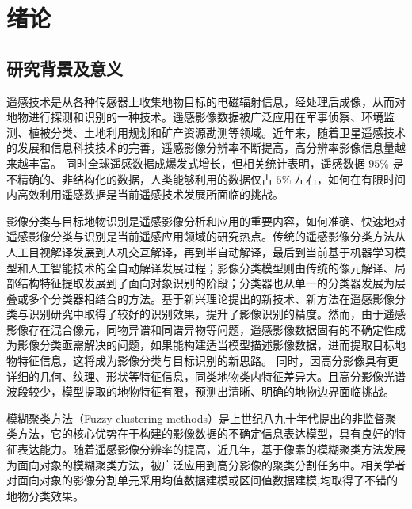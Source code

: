 
\chapter{绪论}
\label{cha:chap01}

\section{研究背景及意义}
\label{sec:first}

遥感技术是从各种传感器上收集地物目标的电磁辐射信息，经处理后成像，从而对地物进行探测和识别的一种技术。遥感影像数据被广泛应用在军事侦察、环境监测、植被分类、土地利用规划和矿产资源勘测等领域\cite{lishihua2005}。近年来，随着卫星遥感技术的发展和信息科技技术的完善，遥感影像分辨率不断提高，高分辨率影像信息量越来越丰富。 同时全球遥感数据成爆发式增长，但相关统计表明，遥感数据 $95\%$ 是不精确的、非结构化的数据，人类能够利用的数据仅占 $5\%$ 左右\cite{zhangjun2010}，如何在有限时间内高效利用遥感数据是当前遥感技术发展所面临的挑战。

影像分类与目标地物识别是遥感影像分析和应用的重要内容，如何准确、快速地对遥感影像分类与识别是当前遥感应用领域的研究热点。传统的遥感影像分类方法从人工目视解译发展到人机交互解译，再到半自动解译，最后到当前基于机器学习模型和人工智能技术的全自动解译发展过程；影像分类模型则由传统的像元解译、局部结构特征提取发展到了面向对象识别的阶段；分类器也从单一的分类器发展为层叠或多个分类器相结合的方法\cite{lideren2012}。基于新兴理论提出的新技术、新方法在遥感影像分类与识别研究中取得了较好的识别效果，提升了影像识别的精度。然而，由于遥感影像存在混合像元，同物异谱和同谱异物等问题\cite{wulun2006}，遥感影像数据固有的不确定性成为影像分类亟需解决的问题，如果能构建适当模型描述影像数据，进而提取目标地物特征信息，这将成为影像分类与目标识别的新思路\cite{he2005comparison}。 同时，因高分影像具有更详细的几何、纹理、形状等特征信息，同类地物类内特征差异大。且高分影像光谱波段较少，模型提取的地物特征有限，预测出清晰、明确的地物边界面临挑战。

模糊聚类方法（Fuzzy clustering methods）\cite{bezdek1984fcm}是上世纪八九十年代提出的非监督聚类方法，它的核心优势在于构建的影像数据的不确定信息表达模型，具有良好的特征表达能力。随着遥感影像分辨率的提高，近几年，基于像素的模糊聚类方法发展为面向对象的模糊聚类方法，被广泛应用到高分影像的聚类分割任务中。相关学者对面向对象的影像分割单元采用均值数据建模\cite{yu2012method}或区间值数据建模\cite{he2016remote},均取得了不错的地物分类效果。

